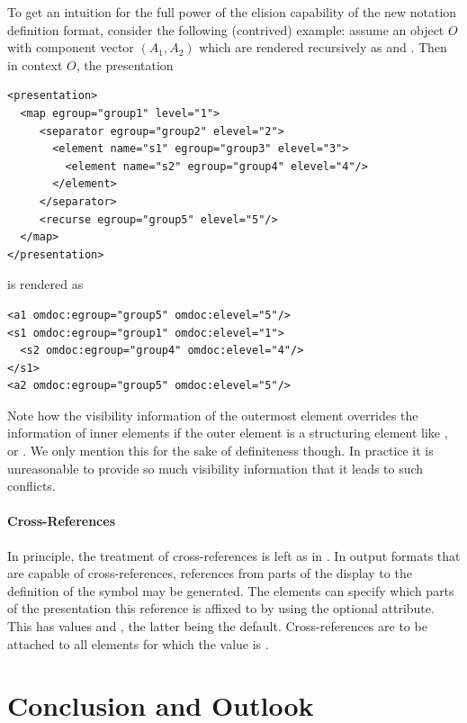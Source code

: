 \documentclass[a4paper]{article}
\begin{document}
To get an intuition for the full power of the elision capability of the new notation
definition format, consider the following (contrived) example: assume an object $O$ with
component vector $(A_1,A_2)$ which are rendered recursively as {} and
{}. Then in context $O$, the
presentation
\begin{lstlisting}[mathescape]
<presentation>
  <map egroup="group1" level="1">
     <separator egroup="group2" elevel="2">
       <element name="s1" egroup="group3" elevel="3">
         <element name="s2" egroup="group4" elevel="4"/>
       </element>
     </separator>
     <recurse egroup="group5" elevel="5"/>
  </map>
</presentation>
\end{lstlisting}
is rendered as
\begin{lstlisting}[mathescape]
<a1 omdoc:egroup="group5" omdoc:elevel="5"/>
<s1 omdoc:egroup="group1" omdoc:elevel="1">
  <s2 omdoc:egroup="group4" omdoc:elevel="4"/>
</s1>
<a2 omdoc:egroup="group5" omdoc:elevel="5"/>
\end{lstlisting}
Note how the visibility information of the outermost element overrides the information of
inner elements if the outer element is a structuring element like {},
{} or {}. We only mention this for the sake of
definiteness though. In practice it is unreasonable to provide so much visibility
information that it leads to such conflicts.


\paragraph{Cross-References}
In principle, the treatment of cross-references is left as in {}. In output
formats that are capable of cross-references, references from parts of the display to the
definition of the symbol may be generated. The {} elements can
specify which parts of the presentation this reference is affixed to by using the optional
{} attribute. This has values {}
and {}, the latter being the default. Cross-references are to
be attached to all elements for which the value is {}.

\section{Conclusion and Outlook}\label{sec:outlook}
\end{document}
